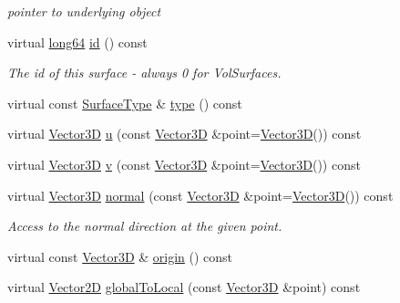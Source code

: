 \begin{DoxyCompactItemize}
\begin{DoxyCompactList}\small\item\em pointer to underlying object \end{DoxyCompactList}\item 
virtual \hyperlink{namespace_d_d_surfaces_ab6b3da366f31f80aec56447ac4442e78}{long64} \hyperlink{class_d_d4hep_1_1_d_d_rec_1_1_vol_surface_a4aca7e181f70ca7319025692b8afd6a6}{id} () const
\begin{DoxyCompactList}\small\item\em The id of this surface -\/ always 0 for Vol\+Surfaces. \end{DoxyCompactList}\item 
virtual const \hyperlink{class_d_d_surfaces_1_1_surface_type}{Surface\+Type} \& \hyperlink{class_d_d4hep_1_1_d_d_rec_1_1_vol_surface_a7a08c8fe2dcd9c0e0fe24f1400f29789}{type} () const
\item 
virtual \hyperlink{class_d_d_surfaces_1_1_vector3_d}{Vector3D} \hyperlink{class_d_d4hep_1_1_d_d_rec_1_1_vol_surface_a91c03b8e7e29245a1c955d459b3077ae}{u} (const \hyperlink{class_d_d_surfaces_1_1_vector3_d}{Vector3D} \&point=\hyperlink{class_d_d_surfaces_1_1_vector3_d}{Vector3D}()) const
\item 
virtual \hyperlink{class_d_d_surfaces_1_1_vector3_d}{Vector3D} \hyperlink{class_d_d4hep_1_1_d_d_rec_1_1_vol_surface_a58966cabf7965016fcb63414b64eedd2}{v} (const \hyperlink{class_d_d_surfaces_1_1_vector3_d}{Vector3D} \&point=\hyperlink{class_d_d_surfaces_1_1_vector3_d}{Vector3D}()) const
\item 
virtual \hyperlink{class_d_d_surfaces_1_1_vector3_d}{Vector3D} \hyperlink{class_d_d4hep_1_1_d_d_rec_1_1_vol_surface_a67e403083cb340e874d6cb777868354d}{normal} (const \hyperlink{class_d_d_surfaces_1_1_vector3_d}{Vector3D} \&point=\hyperlink{class_d_d_surfaces_1_1_vector3_d}{Vector3D}()) const
\begin{DoxyCompactList}\small\item\em Access to the normal direction at the given point. \end{DoxyCompactList}\item 
virtual const \hyperlink{class_d_d_surfaces_1_1_vector3_d}{Vector3D} \& \hyperlink{class_d_d4hep_1_1_d_d_rec_1_1_vol_surface_ae17a8846276ccf5ad449f3c0106bde85}{origin} () const
\item 
virtual \hyperlink{class_d_d_surfaces_1_1_vector2_d}{Vector2D} \hyperlink{class_d_d4hep_1_1_d_d_rec_1_1_vol_surface_aabd166d0d4ad58b57361dbfd0b81fc4d}{global\+To\+Local} (const \hyperlink{class_d_d_surfaces_1_1_vector3_d}{Vector3D} \&point) const

\end{DoxyCompactItemize}
